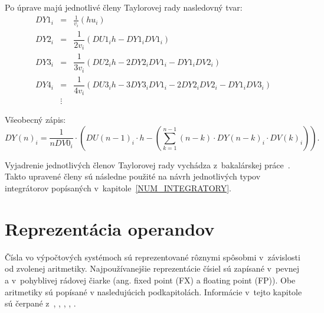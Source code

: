 Po úprave majú jednotlivé členy Taylorovej rady nasledovný tvar:
\begin{eqnarray}
DY1_{i} & = & \frac{1}{v_{i}} (hu_{i}) \label{DY1_cleny_delenia} \\
DY2_{i} & = & \dfrac{1}{2v_{i}} (DU1_{i}h - DY1_{i}DV1_{i}) \label{DY2_cleny_delenia} \\
DY3_{i} & = & \dfrac{1}{3v_{i}} ( DU2_{i}h - 2DY2_{i}DV1_{i} - DY1_{i}DV2_{i} ) \label{DY3_cleny_delenia} \\
DY4_{i} & = & \dfrac{1}{4v_{i}} ( DU3_{i}h - 3DY3_{i}DV1_{i} - 2DY2_{i}DV2_{i} - DY1_{i}DV3_{i} ) \label{DY4_cleny_delenia} \\ 
& \vdots \nonumber & 
\end{eqnarray}

Všeobecný zápis:
\begin{equation}
DY(n)_{i} = \dfrac{1}{n DV0_{i}} \cdot \left( DU(n-1)_{i} \cdot h - \left( \sum_{k=1}^{n-1} (n-k) \cdot DY(n-k)_{i} \cdot DV(k)_{i} \right) \right)  .\label{suma_div}
\end{equation}
\bigskip

Vyjadrenie jednotlivých členov Taylorovej rady vychádza z~bakalárskej práce~\cite{MatecnyBP}. Takto upravené členy sú následne použité na návrh jednotlivých typov integrátorov popísaných v~kapitole~\ref{NUM_INTEGRATORY}.



\chapter{Reprezentácia operandov} \label{REPREZENTACIA_OPERANDOV}
Čísla vo výpočtových systémoch sú reprezentované rôznymi spôsobmi v~závislosti od zvolenej aritmetiky. Najpoužívanejšie reprezentácie čísiel sú zapísané v~pevnej a v~pohyblivej rádovej čiarke (ang. fixed point (FX) a floating point (FP)). Obe aritmetiky sú popísané v nasledujúcich podkapitolách. Informácie v~tejto kapitole sú čerpané z~\cite{FXOnline}, \cite{FPOnline}, \cite{KrausDisP}, \cite{inpFP}, \cite{inpRepDat}.


